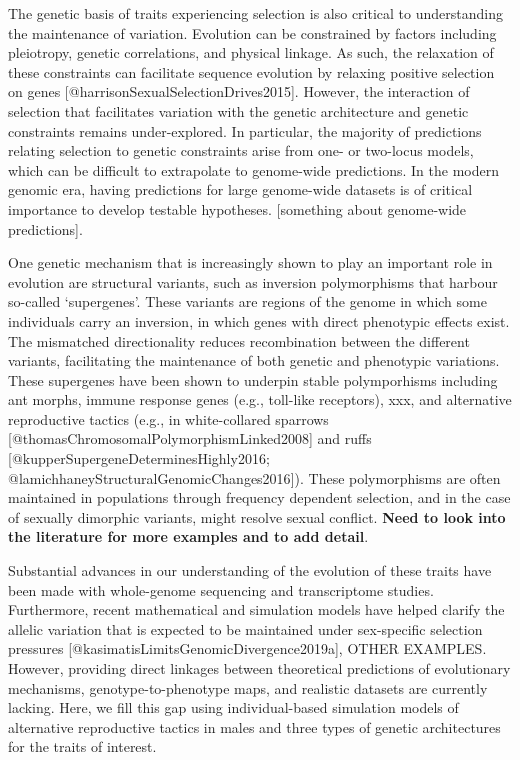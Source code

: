 \documentclass[11pt,]{article}
\begin{document}
The genetic basis of traits experiencing selection is also critical to understanding the maintenance of variation. Evolution can be constrained by factors including pleiotropy, genetic correlations, and physical linkage. As such, the relaxation of these constraints can facilitate sequence evolution by relaxing positive selection on genes {[}@harrisonSexualSelectionDrives2015{]}. However, the interaction of selection that facilitates variation with the genetic architecture and genetic constraints remains under-explored. In particular, the majority of predictions relating selection to genetic constraints arise from one- or two-locus models, which can be difficult to extrapolate to genome-wide predictions. In the modern genomic era, having predictions for large genome-wide datasets is of critical importance to develop testable hypotheses. {[}something about genome-wide predictions{]}.

One genetic mechanism that is increasingly shown to play an important role in evolution are structural variants, such as inversion polymorphisms that harbour so-called `supergenes'. These variants are regions of the genome in which some individuals carry an inversion, in which genes with direct phenotypic effects exist. The mismatched directionality reduces recombination between the different variants, facilitating the maintenance of both genetic and phenotypic variations. These supergenes have been shown to underpin stable polymporhisms including ant morphs, immune response genes (e.g., toll-like receptors), xxx, and alternative reproductive tactics (e.g., in white-collared sparrows {[}@thomasChromosomalPolymorphismLinked2008{]} and ruffs {[}@kupperSupergeneDeterminesHighly2016; @lamichhaneyStructuralGenomicChanges2016{]}). These polymorphisms are often maintained in populations through frequency dependent selection, and in the case of sexually dimorphic variants, might resolve sexual conflict. \textbf{Need to look into the literature for more examples and to add detail}.

Substantial advances in our understanding of the evolution of these traits have been made with whole-genome sequencing and transcriptome studies. Furthermore, recent mathematical and simulation models have helped clarify the allelic variation that is expected to be maintained under sex-specific selection pressures {[}@kasimatisLimitsGenomicDivergence2019a{]}, OTHER EXAMPLES. However, providing direct linkages between theoretical predictions of evolutionary mechanisms, genotype-to-phenotype maps, and realistic datasets are currently lacking. Here, we fill this gap using individual-based simulation models of alternative reproductive tactics in males and three types of genetic architectures for the traits of interest.
\end{document}
